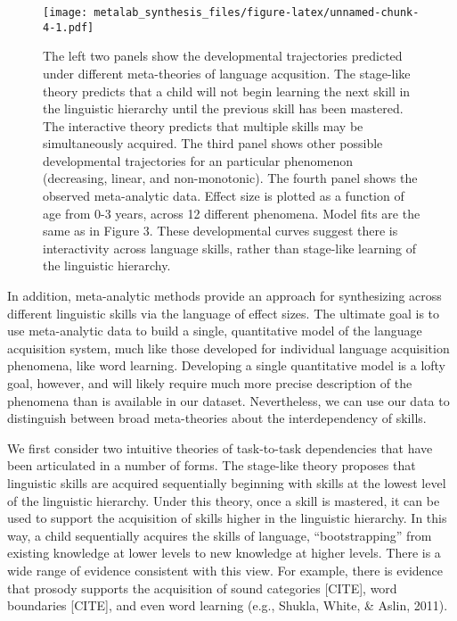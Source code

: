 \documentclass[english,floatsintext,man]{apa6}
\begin{document}
\begin{figure}[htbp]
\centering
\texttt{[image: metalab\_synthesis\_files/figure-latex/unnamed-chunk-4-1.pdf]}
\caption{The left two panels show the developmental trajectories
predicted under different meta-theories of language acqusition. The
stage-like theory predicts that a child will not begin learning the next
skill in the linguistic hierarchy until the previous skill has been
mastered. The interactive theory predicts that multiple skills may be
simultaneously acquired. The third panel shows other possible
developmental trajectories for an particular phenomenon (decreasing,
linear, and non-monotonic). The fourth panel shows the observed
meta-analytic data. Effect size is plotted as a function of age from 0-3
years, across 12 different phenomena. Model fits are the same as in
Figure 3. These developmental curves suggest there is interactivity
across language skills, rather than stage-like learning of the
linguistic hierarchy.}
\end{figure}

In addition, meta-analytic methods provide an approach for synthesizing
across different linguistic skills via the language of effect sizes. The
ultimate goal is to use meta-analytic data to build a single,
quantitative model of the language acquisition system, much like those
developed for individual language acquisition phenomena, like word
learning. Developing a single quantitative model is a lofty goal,
however, and will likely require much more precise description of the
phenomena than is available in our dataset. Nevertheless, we can use our
data to distinguish between broad meta-theories about the
interdependency of skills.

We first consider two intuitive theories of task-to-task dependencies
that have been articulated in a number of forms. The stage-like theory
proposes that linguistic skills are acquired sequentially beginning with
skills at the lowest level of the linguistic hierarchy. Under this
theory, once a skill is mastered, it can be used to support the
acquisition of skills higher in the linguistic hierarchy. In this way, a
child sequentially acquires the skills of language,
\enquote{bootstrapping} from existing knowledge at lower levels to new
knowledge at higher levels. There is a wide range of evidence consistent
with this view. For example, there is evidence that prosody supports the
acquisition of sound categories {[}CITE{]}, word boundaries {[}CITE{]},
and even word learning (e.g., Shukla, White, \& Aslin, 2011).
\end{document}
